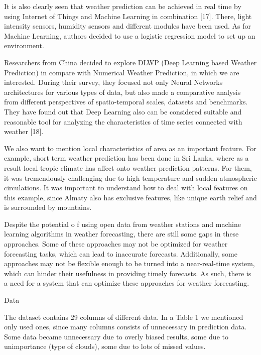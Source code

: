 \begin{multicols}{2}
It is also clearly seen that weather prediction can be achieved in real
time by using Internet of Things and Machine Learning in combination
{[}17{]}. There, light intensity sensors, humidity sensors and different
modules have been used. As for Machine Learning, authors decided to use
a logistic regression model to set up an environment.

Researchers from China decided to explore DLWP (Deep Learning based
Weather Prediction) in compare with Numerical Weather Prediction, in
which we are interested. During their survey, they focused not only
Neural Networks architectures for various types of data, but also made a
comparative analysis from different perspectives of spatio-temporal
scales, datasets and benchmarks. They have found out that Deep Learning
also can be considered suitable and reasonable tool for analyzing the
characteristics of time series connected with weather {[}18{]}.

We also want to mention local characteristics of area as an important
feature. For example, short term weather prediction has been done in Sri
Lanka, where as a result local tropic climate has affect onto weather
prediction patterns. For them, it was tremendously challenging due to
high temperature and sudden atmospheric circulations. It was important
to understand how to deal with local features on this example, since
Almaty also has exclusive features, like unique earth relief and is
surrounded by mountains.

Despite the potential o f using open data from weather stations and
machine learning algorithms in weather forecasting, there are still some
gaps in these approaches. Some of these approaches may not be optimized
for weather forecasting tasks, which can lead to inaccurate forecasts.
Additionally, some approaches may not be flexible enough to be turned
into a near-real-time system, which can hinder their usefulness in
providing timely forecasts. As such, there is a need for a system that
can optimize these approaches for weather forecasting.

Data

The dataset contains 29 columns of different data. In a Table 1 we
mentioned only used ones, since many columns consists of unnecessary in
prediction data. Some data became unnecessary due to overly biased
results, some due to unimportance (type of clouds), some due to lots of
missed values.
\end{multicols}

